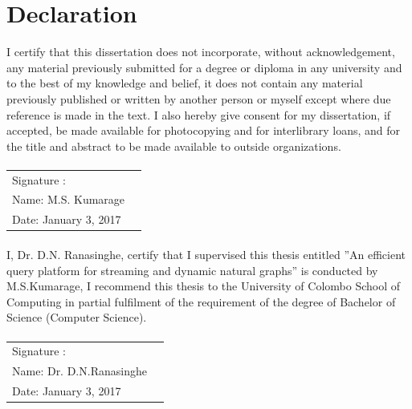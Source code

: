 \documentclass[12pt]{report}
\numberwithin{figure}{section}
\numberwithin{table}{section}
\begin{document}
\section*{Declaration}
%

I certify that this dissertation does not incorporate, without acknowledgement, any material previously submitted for a degree or diploma in any university and to the best of my knowledge and belief, it does not contain any material previously published or written by another person or myself except where due reference is made in the text. I also hereby give consent for my dissertation, if accepted, be made available for photocopying and for interlibrary loans, and for the title and abstract to be made available to outside organizations.

\paragraph{}
\paragraph{}
\noindent
\begin{tabular}{ll}
			Signature : \makebox[2.5in]{\hrulefill} \\
			Name\quad\quad      : M.S. Kumarage \\
			Date\quad\quad\:\;: January 3, 2017\\		
\end{tabular}

\paragraph{}
\paragraph{}

I, Dr. D.N. Ranasinghe, certify that I supervised this thesis entitled ”An efficient query platform for streaming and dynamic natural graphs” is conducted by M.S.Kumarage,  I recommend this thesis to the University of Colombo School of Computing in partial fulfilment of the requirement of the degree of Bachelor of Science (Computer Science).

\paragraph{}
\paragraph{}
\noindent
\begin{tabular}{ll}
			Signature : \makebox[2.5in]{\hrulefill} \\
			Name\quad\quad      : Dr. D.N.Ranasinghe \\
			Date\quad\quad\:\;: January 3, 2017\\		
\end{tabular}
\newpage
\end{document}
